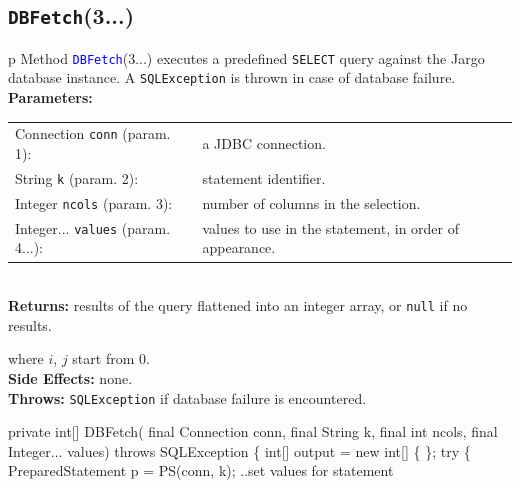 \documentclass{article}
\theoremstyle{definition}                   %
\begin{document}
\subsection{{\tt{}\protect{}DBFetch}(3...)}
\begin{tabular}{p{\textwidth}}
\toprule
{}
Method \textcolor{blue}{{\tt{}\protect{}DBFetch}}(3...) executes a predefined {\tt{}SELECT}
query against the Jargo database instance.
A {\tt{}SQLException} is thrown in case of database failure.\\
\midrule
\textbf{Parameters:} \\
\begin{tabular}{lp{116mm}}
Connection {\tt{}conn} (param. 1):&a JDBC connection.\\
String {\tt{}k} (param. 2):&statement identifier.\\
Integer {\tt{}ncols} (param. 3):&number of columns in the selection.\\
Integer... {\tt{}values} (param. 4...):&values to use in the statement, in order
of appearance.
\end{tabular}\\
\textbf{Returns:} results of the query flattened into an integer array,
or {\tt{}null} if no results.


where $i$, $j$ start from 0.\\
\textbf{Side Effects:} none.\\
\textbf{Throws:} {\tt{}SQLException} if database failure is encountered.\\
\bottomrule
\end{tabular}
\nwenddocs{}\endmoddef{}
private int[] DBFetch(
    final Connection conn, final String k, final int ncols, final Integer... values)
throws SQLException \{
  int[] output = new int[] \{ \};
  try \{
    PreparedStatement p = PS(conn, k);
    \LA{}..set values for statement~{\nwtagstyle{}}\RA{}
\end{document}
